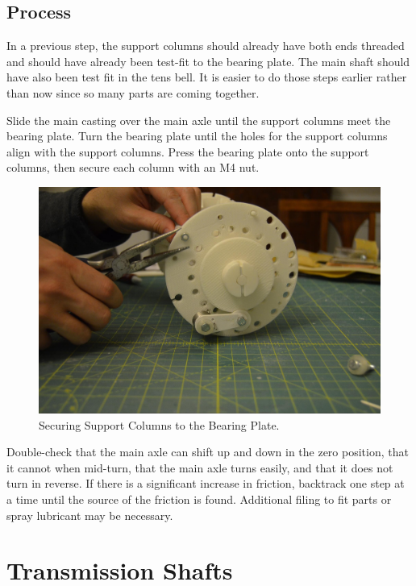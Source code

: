 \documentclass[openany]{book}
\begin{document}
\section{Process}
In a previous step, the support columns should already have both ends threaded and should have already been test-fit to the bearing plate. The main shaft should have also been test fit in the tens bell. It is easier to do those steps earlier rather than now since so many parts are coming together.

Slide the main casting over the main axle until the support columns meet the bearing plate. Turn the bearing plate until the holes for the support columns align with the support columns. Press the bearing plate onto the support columns, then secure each column with an M4 nut.

\begin{figure}[!ht]
	\centering
	\includegraphics[width=.75\textwidth]{images/image32.jpg}
	\caption{Securing Support Columns to the Bearing Plate.}
	\label{fig:image32}	
\end{figure}


Double-check that the main axle can shift up and down in the zero position, that it cannot when mid-turn, that the main axle turns easily, and that it does not turn in reverse. If there is a significant increase in friction, backtrack one step at a time until the source of the friction is found. Additional filing to fit parts or spray lubricant may be necessary.




\chapter{Transmission Shafts}
\end{document}
